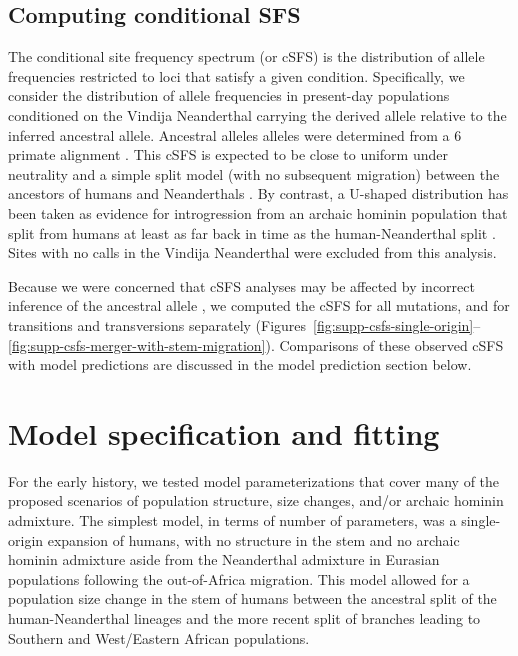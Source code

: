 \documentclass[]{article}
\begin{document}
\subsection{Computing conditional SFS}\label{sec:computing-csfs}

The conditional site frequency spectrum (or cSFS) is the distribution of allele
frequencies restricted to loci that satisfy a given condition. Specifically, we
consider the distribution of allele frequencies in present-day populations
conditioned on the Vindija Neanderthal carrying the derived allele relative to
the inferred ancestral allele. Ancestral alleles alleles were determined from a
6 primate alignment \citep{1000_Genomes_Project_Consortium2015-zq}.
This cSFS is expected to be close to
uniform under neutrality and a simple split model (with no subsequent
migration) between the ancestors of humans and Neanderthals
\citep{Chen2007-iy}. By contrast, a U-shaped distribution has been taken as
evidence for introgression from an archaic hominin population that split from humans at least as far back in time as the human-Neanderthal split
\citet{Durvasula2020-td,Yang2012-ze}.
Sites with no calls in the Vindija Neanderthal were excluded from
this analysis.

Because we were concerned that cSFS analyses may be affected by incorrect
inference of the ancestral allele \citep{Hernandez2007-mf}, we computed the cSFS
for all mutations, and for transitions and transversions separately
(Figures~\ref{fig:supp-csfs-single-origin}--\ref{fig:supp-csfs-merger-with-stem-migration}).
Comparisons of these observed cSFS with model
predictions are discussed in the model prediction section below. 

\section{Model specification and fitting}

For the early history, we tested model parameterizations that cover many of the
proposed scenarios of population structure, size changes, and/or archaic
hominin admixture. The simplest model, in terms of number of parameters, was a
single-origin expansion of humans, with no structure in the stem and no
archaic hominin admixture aside from the Neanderthal admixture in Eurasian populations
following the out-of-Africa migration. This model allowed for a population size
change in the stem of humans between the ancestral split of the
human-Neanderthal lineages and the more recent split of branches leading to
Southern and West/Eastern African populations.
\end{document}
